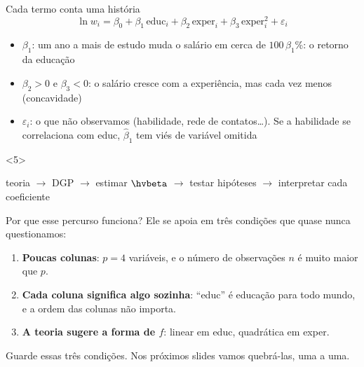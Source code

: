 \documentclass[aspectratio=169,11pt]{beamer}
\begin{document}
\begin{frame}{Cada termo conta uma história}
  \[ \ln w_i = \beta_0 + \beta_1\,\text{educ}_i + \beta_2\,\text{exper}_i
               + \beta_3\,\text{exper}_i^2 + \varepsilon_i \]
  \begin{itemize}
    \item<2-> $\beta_1$: um ano a mais de estudo muda o salário em cerca de
          $100\,\beta_1$\%: o \alert{retorno da educação}
    \item<3-> $\beta_2 > 0$ e $\beta_3 < 0$: o salário cresce com a
          experiência, mas cada vez menos (\alert{concavidade})
    \item<4-> $\varepsilon_i$: o que não observamos (habilidade, rede de
          contatos\ldots). Se a habilidade se correlaciona com educ, $\hat\beta_1$
          tem \alert{viés de variável omitida}
  \end{itemize}
  \begin{onlyenv}<5>
  \begin{conexao}[title={O percurso que vocês conhecem}]
    \small teoria $\to$ DGP $\to$ estimar $\hvbeta$ $\to$ testar hipóteses
    $\to$ \alert{interpretar} cada coeficiente
  \end{conexao}
  \end{onlyenv}
\end{frame}

\begin{frame}{Por que esse percurso funciona?}
  Ele se apoia em três condições que quase nunca questionamos:
  \medskip
  \begin{enumerate}
    \item \textbf{Poucas colunas}: $p = 4$ variáveis, e o número de
          observações $n$ é muito maior que $p$.
    \item \textbf{Cada coluna significa algo sozinha}: ``educ'' é educação
          para todo mundo, e a ordem das colunas não importa.
    \item \textbf{A teoria sugere a forma de $f$}: linear em educ, quadrática
          em exper.
  \end{enumerate}
  \medskip
  \begin{atencao}
    \small Guarde essas três condições. Nos próximos slides vamos quebrá-las,
    uma a uma.
  \end{atencao}
\end{frame}
\end{document}
